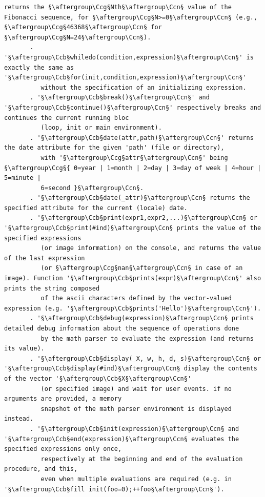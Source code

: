 \documentclass[a4paper,10.5pt,twoside]{book}
\def\Ccb{\color{cb}}
\def\Ccg{\color{cc}}
\def\Ccn{\color{black}}
\begin{document}
\begin{lstlisting}[escapechar=§]
          returns the §\aftergroup\Ccg§Nth§\aftergroup\Ccn§ value of the Fibonacci sequence, for §\aftergroup\Ccg§N>=0§\aftergroup\Ccn§ (e.g., §\aftergroup\Ccg§46368§\aftergroup\Ccn§ for §\aftergroup\Ccg§N=24§\aftergroup\Ccn§). 
       . '§\aftergroup\Ccb§whiledo(condition,expression)§\aftergroup\Ccn§' is exactly the same as '§\aftergroup\Ccb§for(init,condition,expression)§\aftergroup\Ccn§' 
          without the specification of an initializing expression. 
       . '§\aftergroup\Ccb§break()§\aftergroup\Ccn§' and '§\aftergroup\Ccb§continue()§\aftergroup\Ccn§' respectively breaks and continues the current running bloc 
          (loop, init or main environment). 
       . '§\aftergroup\Ccb§date(attr,path)§\aftergroup\Ccn§' returns the date attribute for the given 'path' (file or directory), 
          with '§\aftergroup\Ccg§attr§\aftergroup\Ccn§' being §\aftergroup\Ccg§{ 0=year | 1=month | 2=day | 3=day of week | 4=hour | 5=minute | 
          6=second }§\aftergroup\Ccn§. 
       . '§\aftergroup\Ccb§date(_attr)§\aftergroup\Ccn§ returns the specified attribute for the current (locale) date. 
       . '§\aftergroup\Ccb§print(expr1,expr2,...)§\aftergroup\Ccn§ or '§\aftergroup\Ccb§print(#ind)§\aftergroup\Ccn§ prints the value of the specified expressions 
          (or image information) on the console, and returns the value of the last expression 
          (or §\aftergroup\Ccg§nan§\aftergroup\Ccn§ in case of an image). Function '§\aftergroup\Ccb§prints(expr)§\aftergroup\Ccn§' also prints the string composed 
          of the ascii characters defined by the vector-valued expression (e.g. '§\aftergroup\Ccb§prints('Hello')§\aftergroup\Ccn§'). 
       . '§\aftergroup\Ccb§debug(expression)§\aftergroup\Ccn§ prints detailed debug information about the sequence of operations done 
          by the math parser to evaluate the expression (and returns its value). 
       . '§\aftergroup\Ccb§display(_X,_w,_h,_d,_s)§\aftergroup\Ccn§ or '§\aftergroup\Ccb§display(#ind)§\aftergroup\Ccn§ display the contents of the vector '§\aftergroup\Ccb§X§\aftergroup\Ccn§' 
          (or specified image) and wait for user events. if no arguments are provided, a memory 
          snapshot of the math parser environment is displayed instead. 
       . '§\aftergroup\Ccb§init(expression)§\aftergroup\Ccn§ and '§\aftergroup\Ccb§end(expression)§\aftergroup\Ccn§ evaluates the specified expressions only once, 
          respectively at the beginning and end of the evaluation procedure, and this, 
          even when multiple evaluations are required (e.g. in '§\aftergroup\Ccb§fill init(foo=0);++foo§\aftergroup\Ccn§'). 

\end{lstlisting}
\end{document}
